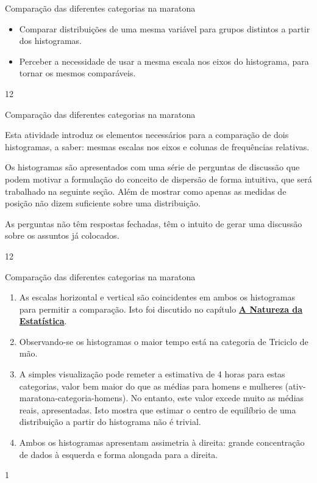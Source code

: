 \clearmargin
\begin{objectives}{Comparação das diferentes categorias na maratona}
{
\begin{itemize}
\item Comparar distribuições de uma mesma variável para grupos distintos a partir dos histogramas.

\item Perceber a necessidade de usar a mesma escala nos eixos do histograma, para tornar os mesmos comparáveis.
\end{itemize}
}{1}{2}
\end{objectives}
\begin{sugestions}{Comparação das diferentes categorias na maratona}
{
Esta atividade introduz os elementos necessários para a comparação de dois histogramas, a saber: mesmas escalas nos eixos e colunas de frequências relativas.

Os histogramas são apresentados com uma série de perguntas de discussão que podem motivar a formulação do conceito de dispersão de forma intuitiva, que será trabalhado na seguinte seção. Além de mostrar como apenas as medidas de posição não dizem suficiente sobre uma distribuição.

As perguntas não têm respostas fechadas, têm o intuito de gerar uma discussão sobre os assuntos já colocados.
}{1}{2}
\end{sugestions}
\begin{answer}{Comparação das diferentes categorias na maratona}
{
\begin{enumerate}
\item As escalas horizontal e vertical são coincidentes em ambos os histogramas para permitir a comparação. Isto foi discutido no capítulo \hyperref[est1-chap]{\textbf{A Natureza da Estatística}}.
\item Observando-se os histogramas o maior tempo está na categoria de Triciclo de mão.
\item A simples visualização pode remeter a estimativa de 4 horas para estas categorias, valor bem maior do que as médias para homens e mulheres (ativ-maratona-categoria-homens). No entanto, este valor excede muito as médias reais, apresentadas. Isto mostra que estimar o centro de equilíbrio de uma distribuição a partir do histograma não é trivial.
\item Ambos os histogramas apresentam assimetria à direita: grande concentração de dados à esquerda e forma alongada para a direita.
\end{enumerate}
}{1}
\end{answer}
